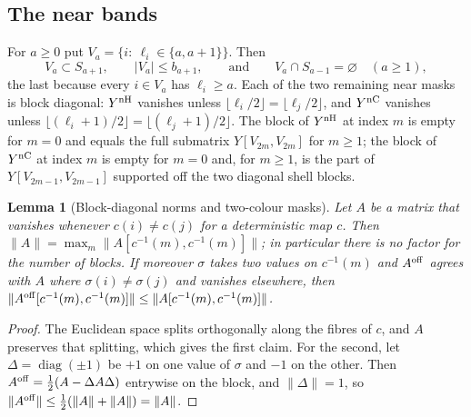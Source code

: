 \documentclass[11pt]{article}
\newtheorem{lemma}[theorem]{Lemma}
\theoremstyle{definition}
\theoremstyle{remark}
\newcommand{\norm}[1]{\lVert#1\rVert}
\newcommand{\diag}{\operatorname{diag}}
\begin{document}
\subsection{The near bands}
\label{mi32-near-bands}

For $a\ge0$ put $V_a=\{i:\ \ell_i\in\{a,a+1\}\}$. Then
\begin{equation}\label{mi32-block-support}
 V_a\subset S_{a+1},\qquad |V_a|\le b_{a+1},
 \qquad\text{and}\qquad
 V_a\cap S_{a-1}=\varnothing\quad(a\ge1),
\end{equation}
the last because every $i\in V_a$ has $\ell_i\ge a$. Each of the two
remaining near masks is block diagonal:
$Y^{\rm nH}$ vanishes unless $\lfloor\ell_i/2\rfloor
=\lfloor\ell_j/2\rfloor$, and $Y^{\rm nC}$ vanishes unless
$\lfloor(\ell_i+1)/2\rfloor=\lfloor(\ell_j+1)/2\rfloor$. The block of
$Y^{\rm nH}$ at index $m$ is empty for $m=0$ and equals the full
submatrix $Y[V_{2m},V_{2m}]$ for $m\ge1$; the block of $Y^{\rm nC}$ at
index $m$ is empty for $m=0$ and, for $m\ge1$, is the part of
$Y[V_{2m-1},V_{2m-1}]$ supported off the two diagonal shell blocks.

\begin{lemma}[Block-diagonal norms and two-colour masks]
\label{mi32-block-norm-lemma}
Let $A$ be a matrix that vanishes whenever $c(i)\ne c(j)$ for a
deterministic map $c$. Then $\norm{A}=\max_m\norm{A[c^{-1}(m),
c^{-1}(m)]}$; in particular there is no factor for the number of
blocks. If moreover $\sigma$ takes two values on $c^{-1}(m)$ and
$A^{\rm off}$ agrees with $A$ where $\sigma(i)\ne\sigma(j)$ and
vanishes elsewhere, then $\norm{A^{\rm off}[c^{-1}(m),c^{-1}(m)]}
\le\norm{A[c^{-1}(m),c^{-1}(m)]}$.
\end{lemma}
\begin{proof}
The Euclidean space splits orthogonally along the fibres of $c$, and
$A$ preserves that splitting, which gives the first claim. For the
second, let $\Delta=\diag(\pm1)$ be $+1$ on one value of $\sigma$ and
$-1$ on the other. Then $A^{\rm off}=\tfrac12(A-\Delta A\Delta)$
entrywise on the block, and $\norm{\Delta}=1$, so
$\norm{A^{\rm off}}\le\tfrac12(\norm{A}+\norm{A})=\norm{A}$.
\end{proof}
\end{document}
